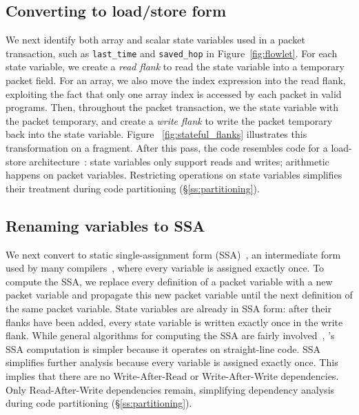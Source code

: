 \subsection{Converting to load/store form}

We next identify both array and scalar state variables used in a packet
transaction, such as \texttt{last\_time} and \texttt{saved\_hop} in
Figure~\ref{fig:flowlet}. For each state variable, we create a \textit{read
flank} to read the state variable into a temporary packet field. For an array,
we also move the index expression into the read flank, exploiting the fact that
only one array index is accessed by each packet in valid \pktlanguage programs.
Then, throughout the packet transaction, we the state variable with the packet
temporary, and create a \textit{write flank} to write the packet temporary back
into the state variable.  Figure ~\ref{fig:stateful_flanks} illustrates this
transformation on a fragment.  After this pass, the code resembles code for a
load-store architecture~\cite{load_store}: state variables only support reads
and writes; arithmetic happens on packet variables.  Restricting operations on
state variables simplifies their treatment during code partitioning
(\S\ref{ss:partitioning}).

\subsection{Renaming variables to SSA}
\label{ss:ssa}

We next convert to static single-assignment form (SSA)~\cite{ssa}, an
intermediate form used by many compilers~\cite{tree_ssa, llvm}, where every
variable is assigned exactly once. To compute the SSA, we replace every
definition of a packet variable with a new packet variable and propagate this
new packet variable until the next definition of the same packet variable.
State variables are already in SSA form: after their flanks have been added,
every state variable is written exactly once in the write flank.  While general
algorithms for computing the SSA are fairly involved~\cite{ssa}, \pktlanguage's
SSA computation is simpler because it operates on straight-line code.  SSA
simplifies further analysis because every variable is assigned exactly once.
This implies that there are no Write-After-Read or Write-After-Write
dependencies. Only Read-After-Write dependencies remain, simplifying dependency
analysis during code partitioning (\S\ref{ss:partitioning}).

